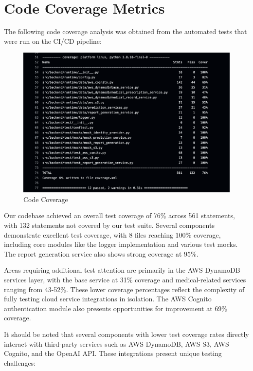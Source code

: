 \documentclass[12pt, titlepage]{article}
\begin{document}
  \clearpage
  \newpage
\section{Code Coverage Metrics}
The following code coverage analysis was obtained from the automated tests that were run on the CI/CD pipeline:
\begin{figure}[ht!]
  \centering
  \includegraphics[scale=0.6]{../assets/cov.png}
  \caption{Code Coverage}
  \label{fig:Coverage}
\end{figure}

\vspace{10pt}
\noindent Our codebase achieved an overall test coverage of 76\% across 561 statements, with 132 statements not covered by our test suite. Several components demonstrate excellent test coverage, with 8 files reaching 100\% coverage, including core modules like the logger implementation and various test mocks. The report generation service also shows strong coverage at 95\%.

\vspace{10pt}
\noindent Areas requiring additional test attention are primarily in the AWS DynamoDB services layer, with the base service at 31\% coverage and medical-related services ranging from 43-52\%. These lower coverage percentages reflect the complexity of fully testing cloud service integrations in isolation. The AWS Cognito authentication module also presents opportunities for improvement at 69\% coverage.

\vspace{10pt}
\noindent It should be noted that several components with lower test coverage rates directly interact with third-party services such as AWS DynamoDB, AWS S3, AWS Cognito, and the OpenAI API. These integrations present unique testing challenges:
\end{document}
